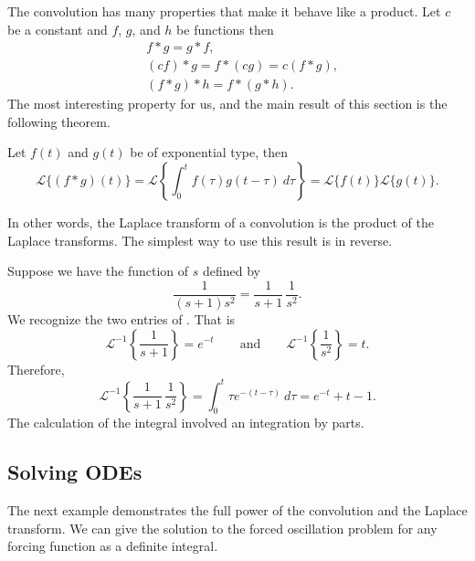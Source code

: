 The convolution has many properties that make it behave like a product.
Let $c$ be a constant and $f$, $g$, and $h$ be functions then
\begin{align*}
& f * g = g * f , \\
& (c f) * g = f * (c g) = c (f*g) , \\
& ( f * g ) * h = f * ( g * h ) .
\end{align*}
The most interesting property for us, and
the main result of this section is the following theorem.

\begin{theorem}
Let $f(t)$ and $g(t)$ be of exponential type, then
\begin{equation*}
\boxed{~~
\mathcal{L} \bigl\{ (f*g)(t) \bigr\}
=
\mathcal{L} \left\{ \int_0^t f(\tau) g(t-\tau) ~ d\tau \right\}
=
\mathcal{L} \bigl\{ f(t) \bigr\} \mathcal{L} \bigl\{ g(t) \bigr\} .
~~}
\end{equation*}
\end{theorem}

In other words, the Laplace transform of a convolution is the product
of the Laplace transforms.  The simplest way to use this result is in
reverse.

\begin{example}
Suppose we have the function of $s$
defined by
\begin{equation*}
\frac{1}{(s+1)s^2} = 
\frac{1}{s+1}\,
\frac{1}{s^2} .
\end{equation*}
We recognize the two entries of .  That is
\begin{equation*}
\mathcal{L}^{-1} 
\left\{
\frac{1}{s+1} \right\}
= e^{-t}
\qquad \text{and} \qquad
\mathcal{L}^{-1} 
\left\{
\frac{1}{s^2} \right\} 
= t.
\end{equation*}
Therefore,
\begin{equation*}
\mathcal{L}^{-1}
\left\{
\frac{1}{s+1}\,
\frac{1}{s^2} \right\}
=
\int_0^t
\tau e^{-(t-\tau)} ~d\tau
=
e^{-t}+t-1 .
\end{equation*}
The calculation of the integral involved an integration by parts.
\end{example}

\subsection{Solving ODEs}

The next example demonstrates the full power of the convolution and
the Laplace transform.  We can give the solution to
the forced oscillation problem for any forcing function as a definite
integral.

